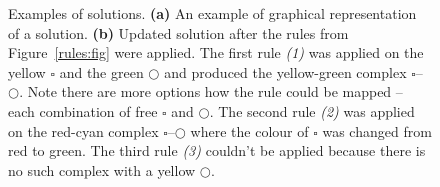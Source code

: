 \documentclass[12pt, twoside]{fithesis2} %
\begin{document}
\begin{figure}[!h]
\begin{center}
\end{center}
\caption{Examples of solutions. \textbf{(a)} An example of graphical representation of a solution. \textbf{(b)} Updated solution after the rules from Figure~\ref{rules:fig} were applied. The first rule \emph{(1)} was applied on the yellow {\large $\square$} and the green $\bigcirc$ and produced the yellow-green complex {\large $\square$}--$\bigcirc$. Note there are more options how the rule could be mapped -- each combination of free {\large $\square$} and $\bigcirc$. The second rule \emph{(2)} was applied on the red-cyan complex {\large $\square$}--$\bigcirc$ where the colour of {\large $\square$} was changed from red to green. The third rule \emph{(3)} couldn't be applied because there is no such complex with a yellow $\bigcirc$. }\label{solutions:fig}
\end{figure}

\end{document}
